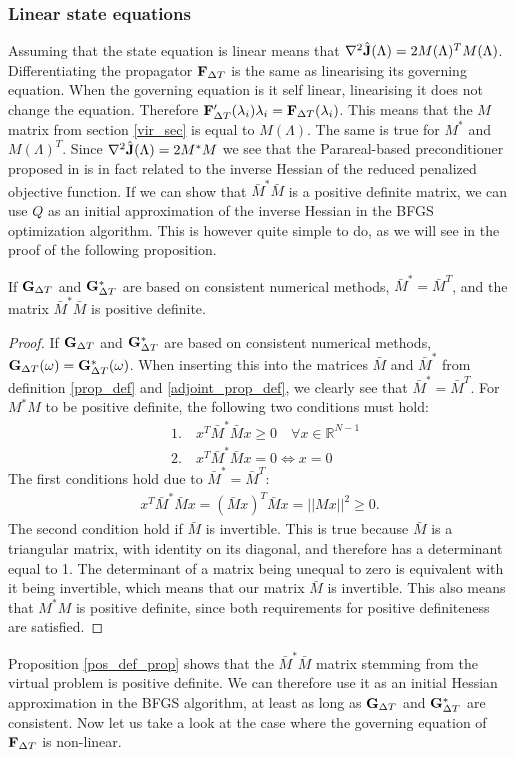 \subsubsection{Linear state equations}
Assuming that the state equation is linear means that $\nabla^2 \hat{\bold J}(\Lambda)=2M(\Lambda)^TM(\Lambda)$. Differentiating the propagator $\bold F_{\Delta T}$ is the same as linearising its governing equation. When the governing equation is it self linear, linearising it does not change the equation. Therefore $\bold F_{\Delta T}'(\lambda_i)\lambda_i = \bold F_{\Delta T}(\lambda_i)$. This means that the $M$ matrix from section \ref{vir_sec} is equal to $M(\Lambda)$. The same is true for $M^*$ and $M(\Lambda)^T$. Since  $\nabla^2 \hat{\bold J}(\Lambda)=2M^*M$ we see that the Parareal-based preconditioner proposed in \cite{maday2002parareal} is in fact related to the inverse Hessian of the reduced penalized objective function. If we can show that $\bar M^*\bar M$ is a positive definite matrix, we can use $Q$ as an initial approximation of the inverse Hessian in the BFGS optimization algorithm. This is however quite simple to do, as we will see in the proof of the following proposition.
\begin{proposition} \label{pos_def_prop}
 If $\bold G_{\Delta T}$ and $\bold G_{\Delta T}^*$ are based on consistent numerical methods, $\bar M^*=\bar M^T$, and the matrix $\bar M^*\bar M$ is positive definite.
\end{proposition}
\begin{proof}
If $\bold G_{\Delta T}$ and $\bold G_{\Delta T}^*$ are based on consistent numerical methods, $\bold G_{\Delta T}(\omega)=\bold G_{\Delta T}^*(\omega)$. When inserting this into the matrices $\bar M$ and $\bar M^*$ from definition \ref{prop_def} and \ref{adjoint_prop_def}, we clearly see that $\bar M^*=\bar M^T$. For $M^*M$ to be positive definite, the following two conditions must hold:
\begin{align*}
&1.\quad x^T\bar M^*\bar Mx \geq 0 \quad \forall x\in\mathbb{R}^{N-1} \\
&2.\quad x^T\bar M^*\bar Mx =0 \iff x=0
\end{align*}
The first conditions hold due to $\bar M^*=\bar M^T$:
\begin{align*}
x^T\bar M^*\bar Mx = (\bar Mx)^T\bar Mx = ||Mx||^2 \geq 0.
\end{align*}
The second condition hold if $\bar M$ is invertible. This is true because $\bar M$ is a triangular matrix, with identity on its diagonal, and therefore has a determinant equal to 1. The determinant of a matrix being unequal to zero is equivalent with it being invertible, which means that our matrix $\bar M$ is invertible. This also means that $M^*M$ is positive definite, since both requirements for positive definiteness are satisfied. 
\end{proof}
\noindent
Proposition \ref{pos_def_prop} shows that the $\bar M^*\bar M$ matrix stemming from the virtual problem is positive definite. We can therefore use it as an initial Hessian approximation in the BFGS algorithm, at least as long as $\bold G_ {\Delta T}$ and $\bold G_ {\Delta T}^*$ are consistent. Now let us take a look at the case where the governing equation of $\bold F_{\Delta T}$ is non-linear.
